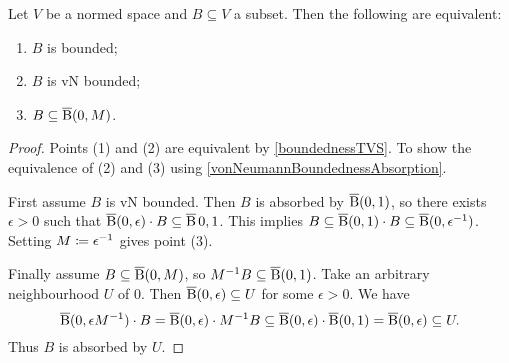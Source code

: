 \begin{lemma} \label{boundedSetNormedSpace}
Let $V$ be a normed space and $B\subseteq V$ a subset. Then the following are equivalent:
\begin{enumerate}
\item $B$ is bounded;
\item $B$ is vN bounded;
\item $B\subseteq \operatorname{\overline{B}}(0, M)$.
\end{enumerate}
\end{lemma}
\begin{proof}
Points (1) and (2) are equivalent by \ref{boundednessTVS}. To show the equivalence of (2) and (3) using \ref{vonNeumannBoundednessAbsorption}.

First assume $B$ is vN bounded. Then $B$ is absorbed by $\operatorname{\overline{B}}(0,1)$, so there exists $\epsilon > 0$ such that $\operatorname{\overline{B}}(0,\epsilon)\cdot B \subseteq \operatorname{\overline{B}}{0,1}$. This implies $B\subseteq \operatorname{\overline{B}}(0,1)\cdot B \subseteq \operatorname{\overline{B}}(0,\epsilon^{-1})$. Setting $M\coloneqq \epsilon^{-1}$ gives point (3).

Finally assume $B\subseteq \operatorname{\overline{B}}(0, M)$, so $M^{-1}B \subseteq \operatorname{\overline{B}}(0,1)$. Take an arbitrary neighbourhood $U$ of $0$. Then $\operatorname{\overline{B}}(0,\epsilon) \subseteq U$ for some $\epsilon > 0$. We have
\[ \operatorname{\overline{B}}(0, \epsilon M^{-1})\cdot B = \operatorname{\overline{B}}(0, \epsilon)\cdot M^{-1}B \subseteq \operatorname{\overline{B}}(0, \epsilon)\cdot \operatorname{\overline{B}}(0, 1) = \operatorname{\overline{B}}(0, \epsilon) \subseteq U. \]
Thus $B$ is absorbed by $U$.
\end{proof}

